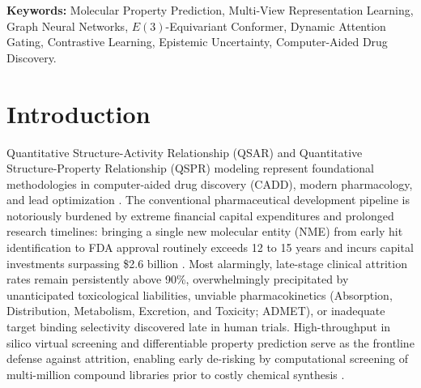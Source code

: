 \documentclass[10pt,twocolumn]{article}
\begin{document}
\noindent\textbf{Keywords:} Molecular Property Prediction, Multi-View Representation Learning, Graph Neural Networks, $E(3)$-Equivariant Conformer, Dynamic Attention Gating, Contrastive Learning, Epistemic Uncertainty, Computer-Aided Drug Discovery.

\section{Introduction}

Quantitative Structure-Activity Relationship (QSAR) and Quantitative Structure-Property Relationship (QSPR) modeling represent foundational methodologies in computer-aided drug discovery (CADD), modern pharmacology, and lead optimization \cite{agrafiotis2007advances, chen2018rise}. The conventional pharmaceutical development pipeline is notoriously burdened by extreme financial capital expenditures and prolonged research timelines: bringing a single new molecular entity (NME) from early hit identification to FDA approval routinely exceeds 12 to 15 years and incurs capital investments surpassing \$2.6 billion \cite{dimasi2016innovation}. Most alarmingly, late-stage clinical attrition rates remain persistently above 90\%, overwhelmingly precipitated by unanticipated toxicological liabilities, unviable pharmacokinetics (Absorption, Distribution, Metabolism, Excretion, and Toxicity; ADMET), or inadequate target binding selectivity discovered late in human trials. High-throughput in silico virtual screening and differentiable property prediction serve as the frontline defense against attrition, enabling early de-risking by computational screening of multi-million compound libraries prior to costly chemical synthesis \cite{yang2019analyzing, coley2019autonomous}.
\end{document}
